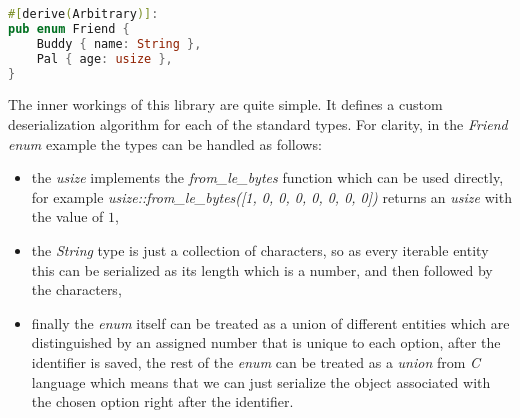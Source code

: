 \begin{minipage}{\linewidth}
\begin{lstlisting}[language=Rust,caption={Example of \textit{Arbitrary} crate usage.},label={lst:arb_crate}]
#[derive(Arbitrary)]:
pub enum Friend {
    Buddy { name: String },
    Pal { age: usize },
} 
\end{lstlisting} 
\end{minipage}

The inner workings of this library are quite simple. It defines a custom deserialization algorithm for each of the standard types. For clarity, in the \textit{Friend} \textit{enum} example the types can be handled as follows:
\begin{itemize}
    \item the \textit{usize} implements the \textit{from\_le\_bytes} function which can be used directly, for example \textit{usize::from\_le\_bytes([1, 0, 0, 0, 0, 0, 0, 0])} returns an \textit{usize} with the value of $1$,
    \item the \textit{String} type is just a collection of characters, so as every iterable entity this can be serialized as its length which is a number, and then followed by the characters,
    \item finally the \textit{enum} itself can be treated as a union of different entities which are distinguished by an assigned number that is unique to each option, after the identifier is saved, the rest of the \textit{enum} can be treated as a \textit{union} from \textit{C} language which means that we can just serialize the object associated with the chosen option right after the identifier.
\end{itemize}

